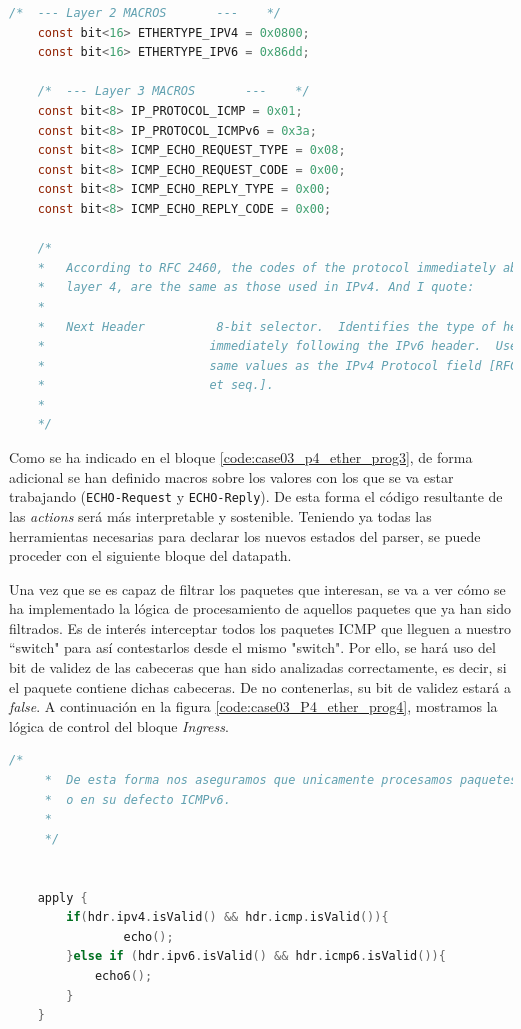\begin{lstlisting}[language=C, style=P4-color, caption={Macros para parsear L2 y L3  - Case03},label=code:case03_p4_ether_prog3]
    /*	---	Layer 2 MACROS	     ---	*/
    const bit<16> ETHERTYPE_IPV4 = 0x0800;
    const bit<16> ETHERTYPE_IPV6 = 0x86dd;
    
    /*	---	Layer 3 MACROS	     ---	*/
    const bit<8> IP_PROTOCOL_ICMP = 0x01;
    const bit<8> IP_PROTOCOL_ICMPv6 = 0x3a; 
    const bit<8> ICMP_ECHO_REQUEST_TYPE = 0x08;
    const bit<8> ICMP_ECHO_REQUEST_CODE = 0x00;
    const bit<8> ICMP_ECHO_REPLY_TYPE = 0x00;
    const bit<8> ICMP_ECHO_REPLY_CODE = 0x00;
    
    /*
    *   According to RFC 2460, the codes of the protocol immediately above,
    *   layer 4, are the same as those used in IPv4. And I quote:
    *
    *   Next Header          8-bit selector.  Identifies the type of header
    *                       immediately following the IPv6 header.  Uses the
    *                       same values as the IPv4 Protocol field [RFC-1700
    *                       et seq.].
    *
    */
\end{lstlisting}
\vspace{0.5cm}

Como se ha indicado en el bloque \ref{code:case03_p4_ether_prog3},  de forma adicional se han definido macros sobre los valores con los que se va estar trabajando (\texttt{ECHO-Request} y \texttt{ECHO-Reply}). De esta forma el código resultante de las \textit{actions} será más interpretable y sostenible. Teniendo ya todas las herramientas necesarias para declarar los nuevos estados del parser, se puede proceder con el siguiente bloque del datapath.\\
\par

Una vez que se es capaz de filtrar los paquetes que interesan, se va a ver cómo se ha implementado la lógica de procesamiento de aquellos paquetes que ya han sido filtrados. Es de interés interceptar todos los paquetes ICMP que lleguen a nuestro ``switch" para así contestarlos desde el mismo "switch". Por ello, se hará uso del bit de validez de las cabeceras que han sido analizadas correctamente, es decir, si el paquete contiene dichas cabeceras. De no contenerlas, su bit de validez estará a \textit{false}. A continuación en la figura \ref{code:case03_P4_ether_prog4}, mostramos la lógica de control del bloque \textit{Ingress}.


\begin{lstlisting}[language=C, style=P4-color, caption={Lógica para filtrar paquetes ICMP e ICMPv6  - Case03},label=code:case03_P4_ether_prog4]
    /*  
     *  De esta forma nos aseguramos que unicamente procesamos paquetes ICMP,
     *  o en su defecto ICMPv6.
     *
     */
    
    
    apply {
    	if(hdr.ipv4.isValid() && hdr.icmp.isValid()){
    	        echo();
    	}else if (hdr.ipv6.isValid() && hdr.icmp6.isValid()){
    		echo6();
    	}
    }
\end{lstlisting}
\vspace{0.5cm}

